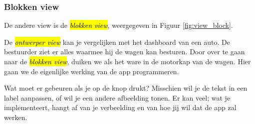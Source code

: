 %


\subsubsection{Blokken view}

De andere view is de \hl{\emph{blokken view}}, weergegeven in Figuur \ref{fig:view_block}.


De \hl{\emph{ontwerper view}} kan je vergelijken met het dashboard van een auto. De bestuurder ziet er alles waarmee hij de wagen kan besturen.
Door over te gaan naar de \hl{\emph{blokken view}}, duiken we als het ware in de motorkap van de wagen. Hier gaan we de eigenlijke werking van de app programmeren.

Wat moet er gebeuren als je op de knop drukt? Misschien wil je de tekst in een label aanpassen, of wil je een andere afbeelding tonen. Er kan veel; wat je implementeert, hangt af van je verbeelding en van hoe jij wil dat de app zal werken.

